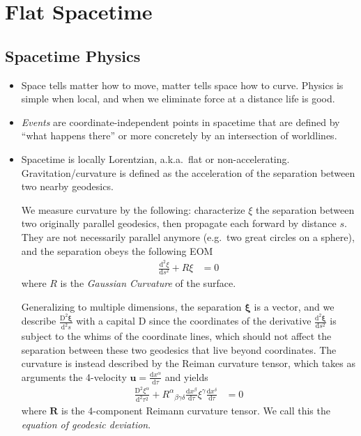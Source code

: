 \documentclass[12pt]{report}
\newcommand{\rd}[2]{\frac{\mathrm{d}#1}{\mathrm{d}#2}}
\newcommand{\rtd}[2]{\frac{\mathrm{d}^2#1}{\mathrm{d}#2^2}}
\newcommand{\bm}[1]{\boldsymbol{\mathbf{#1}}}
\begin{document}
\onehalfspacing

\pagestyle{fancy}
\cfoot{\thepage/\pageref{LastPage}}

\tableofcontents

\chapter{Flat Spacetime}

\section{Spacetime Physics}

\begin{itemize}
    \item Space tells matter how to move, matter tells space how to curve.
        Physics is simple when local, and when we eliminate force at a distance
        life is good.

    \item \emph{Events} are coordinate-independent points in spacetime that are
        defined by ``what happens there'' or more concretely by an intersection
        of worldlines.

    \item Spacetime is locally Lorentzian, a.k.a.\ flat or non-accelerating.
        Gravitation/curvature is defined as the acceleration of the separation
        between two nearby geodesics.

        We measure curvature by the following: characterize $\xi$ the separation
        between two originally parallel geodesics, then propagate each forward
        by distance $s$. They are not necessarily parallel anymore (e.g.\ two
        great circles on a sphere), and the separation obeys the following EOM
        \begin{align}
            \rtd{\xi}{s} + R\xi &= 0
        \end{align}
        where $R$ is the \emph{Gaussian Curvature} of the surface.

        Generalizing to multiple dimensions, the separation $\bm{\xi}$ is a
        vector, and we describe $\frac{\mathrm{D}^2\bm{\xi}}{\mathrm{d}^2s}$
        with a capital $\mathrm{D}$ since the coordinates of the derivative
        $\rtd{\bm{\xi}}{s}$ is subject to the whims of the coordinate lines,
        which should not affect the separation between these two geodesics that
        live beyond coordinates. The curvature is instead described by the
        Reiman curvature tensor, which takes as arguments the 4-velocity
        $\bm{u} = \rd{x^\alpha}{\tau}$ and yields
        \begin{align}
            \frac{\mathrm{D}^2\xi^\alpha}{\mathrm{d}^2\tau^2} +
                {R^{\alpha}}_{\beta\gamma\delta}
                \rd{x^\beta}{\tau}\xi^\gamma \rd{x^\delta}{\tau} &= 0
        \end{align}
        where $\bm{R}$ is the 4-component Reimann curvature tensor. We call
        this the \emph{equation of geodesic deviation}.


\end{itemize}
\end{document}

